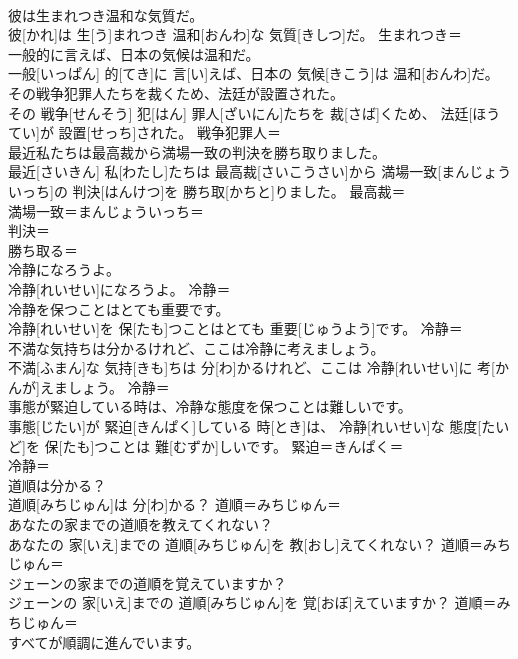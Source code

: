 \documentclass[8pt]{extreport}
\begin{document}
\begin{CJK}{UTF8}{min}
\\	彼は生まれつき温和な気質だ。	
\\	彼[かれ]は 生[う]まれつき 温和[おんわ]な 気質[きしつ]だ。	生まれつき＝ 
\\	一般的に言えば、日本の気候は温和だ。	
\\	一般[いっぱん] 的[てき]に 言[い]えば、日本の 気候[きこう]は 温和[おんわ]だ。	
\\	その戦争犯罪人たちを裁くため、法廷が設置された。	
\\	その 戦争[せんそう] 犯[はん] 罪人[ざいにん]たちを 裁[さば]くため、 法廷[ほうてい]が 設置[せっち]された。	戦争犯罪人＝ 
\\	最近私たちは最高裁から満場一致の判決を勝ち取りました。	
\\	最近[さいきん] 私[わたし]たちは 最高裁[さいこうさい]から 満場一致[まんじょういっち]の 判決[はんけつ]を 勝ち取[かちと]りました。	最高裁＝ 
\\	満場一致＝まんじょういっち＝ 
\\	判決＝ 
\\	勝ち取る＝ 
\\	冷静になろうよ。	
\\	冷静[れいせい]になろうよ。	冷静＝ 
\\	冷静を保つことはとても重要です。	
\\	冷静[れいせい]を 保[たも]つことはとても 重要[じゅうよう]です。	冷静＝ 
\\	不満な気持ちは分かるけれど、ここは冷静に考えましょう。	
\\	不満[ふまん]な 気持[きも]ちは 分[わ]かるけれど、ここは 冷静[れいせい]に 考[かんが]えましょう。	冷静＝ 
\\	事態が緊迫している時は、冷静な態度を保つことは難しいです。	
\\	事態[じたい]が 緊迫[きんぱく]している 時[とき]は、 冷静[れいせい]な 態度[たいど]を 保[たも]つことは 難[むずか]しいです。	緊迫＝きんぱく＝ 
\\	冷静＝ 
\\	道順は分かる？	
\\	道順[みちじゅん]は 分[わ]かる？	道順＝みちじゅん＝ 
\\	あなたの家までの道順を教えてくれない？	
\\	あなたの 家[いえ]までの 道順[みちじゅん]を 教[おし]えてくれない？	道順＝みちじゅん＝ 
\\	ジェーンの家までの道順を覚えていますか？	
\\	ジェーンの 家[いえ]までの 道順[みちじゅん]を 覚[おぼ]えていますか？	道順＝みちじゅん＝ 
\\	すべてが順調に進んでいます。	

\end{CJK}
\end{document}
